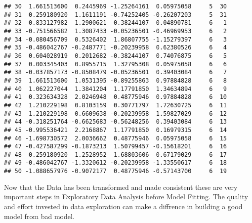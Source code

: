 \documentclass[12pt,]{article}
\begin{document}
\begin{verbatim}
## 30  1.661513600  0.2445969 -1.25264161  0.05975058     5  30
## 31  0.259180920  1.1611191 -0.74252405 -0.26207203     5  31
## 32  0.833127982  1.2900621 -0.38244107 -0.04890781     6   1
## 33 -0.751566582  1.3087433 -0.05236501 -0.46969953     6   2
## 34 -0.080456709  0.5326402  1.86807755 -1.15279397     6   3
## 35 -0.486042767 -0.2487771 -0.20239958  0.62380526     6   4
## 36  0.604028919  0.2012682 -0.38244107  0.74076875     6   5
## 37  0.003345403  0.8955715  1.32795308  0.05975058     6   6
## 38 -0.037857173 -0.8508479 -0.05236501  0.39403084     6   7
## 39  1.661513600  1.0531395 -0.89255863  0.97884828     6   8
## 40  1.062227044  1.3841204  1.17791850  1.34634894     6   9
## 41  0.323634328  2.0246948  0.48775946  0.97884828     6  10
## 42  1.210229198  0.8103159  0.30771797  1.72630725     6  11
## 43  1.210229198  0.6609638 -0.20239958  1.59827029     6  12
## 44 -0.318251764 -0.6625683 -0.56248256  0.39403084     6  13
## 45 -0.995536421  2.2168867  1.17791850  0.16979315     6  14
## 46 -1.698730572  2.0036662  0.48775946  0.05975058     6  15
## 47 -0.427587299 -0.1873213  1.50799457 -0.15618201     6  16
## 48  0.259180920  1.2528952  1.68803606 -0.67179029     6  17
## 49 -0.486042767 -1.3320612 -0.20239958 -1.33550617     6  18
## 50 -1.088657976 -0.9072177  0.48775946 -0.57143700     6  19
\end{verbatim}

Now that the Data has been transformed and made consistent these are
very important steps in Exploratory Data Analysis before Model Fitting.
The quality and effort invested in data exploration can make a diffrence
in building a good model from bad model.
\end{document}
